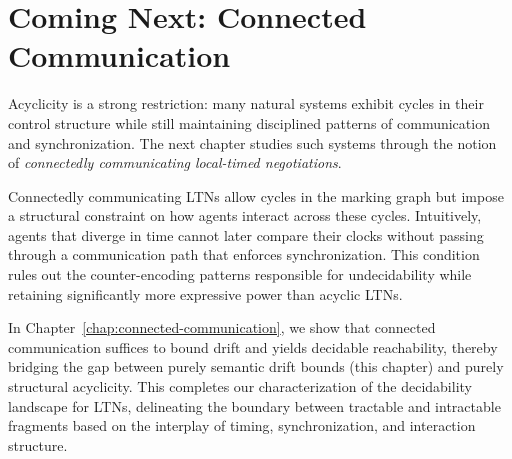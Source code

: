 \section{Coming Next: Connected Communication}
\label{sec:drift-next}

Acyclicity is a strong restriction: many natural systems exhibit cycles in their control structure while still maintaining disciplined patterns of communication and synchronization. The next chapter studies such systems through the notion of \emph{connectedly communicating local-timed negotiations}.

Connectedly communicating LTNs allow cycles in the marking graph but impose a structural constraint on how agents interact across these cycles. Intuitively, agents that diverge in time cannot later compare their clocks without passing through a communication path that enforces synchronization. This condition rules out the counter-encoding patterns responsible for undecidability while retaining significantly more expressive power than acyclic LTNs.

In Chapter~\ref{chap:connected-communication}, we show that connected communication suffices to bound drift and yields decidable reachability, thereby bridging the gap between purely semantic drift bounds (this chapter) and purely structural acyclicity. This completes our characterization of the decidability landscape for LTNs, delineating the boundary between tractable and intractable fragments based on the interplay of timing, synchronization, and interaction structure.